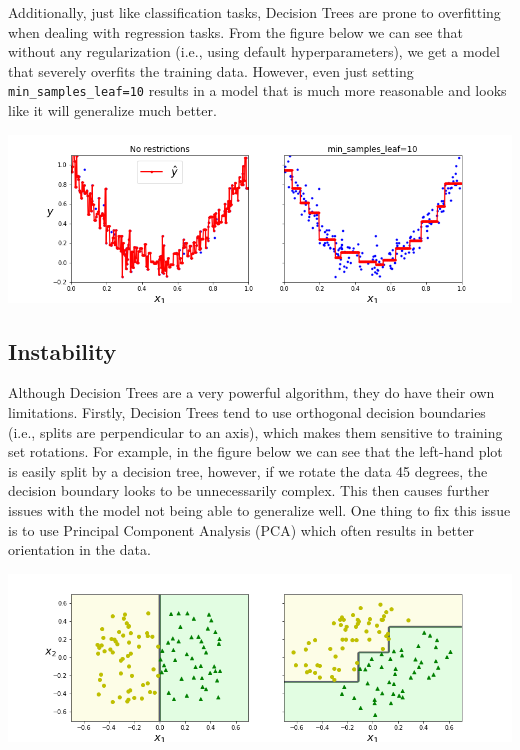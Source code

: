 \noindent
Additionally, just like classification tasks, Decision Trees are prone to overfitting when dealing with regression tasks. From the figure below
we can see that without any regularization (i.e., using default hyperparameters), we get a model that severely overfits the training data. However,
even just setting \texttt{min_samples_leaf=10} results in a model that is much more reasonable and looks like it will generalize
much better.

\begin{center}
\includegraphics[scale=0.45]{Images/tree_regression_regularization_plot.png}
\end{center}

\subsection{Instability}

Although Decision Trees are a very powerful algorithm, they do have their own limitations. Firstly, Decision Trees tend to use orthogonal
decision boundaries (i.e., splits are perpendicular to an axis), which makes them sensitive to training set rotations. For example, in the 
figure below we can see that the left-hand plot is easily split by a decision tree, however, if we rotate the data 45 degrees, the decision 
boundary looks to be unnecessarily complex. This then causes further issues with the model not being able to generalize well. One thing to fix 
this issue is to use Principal Component Analysis (PCA) which often results in better orientation in the data.

\begin{center}
\includegraphics[scale=0.45]{Images/sensitivity_to_rotation_plot.png}
\end{center}

